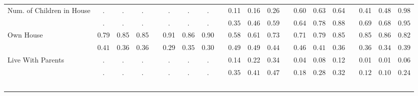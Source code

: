 \begin{center}
{\begin{longtable}{L{5cm} c c c p{.5cm} c c c p{.5cm} c c c p{.5cm} c c c p{.5cm} c c c}
 \quad Num. of Children in House & . &         . &         . & &         . &         . &         . & &      0.11 &      0.16 &      0.26 & &      0.60 &      0.63 &      0.64 & &      0.41 &      0.48 &      0.98 \\*
 \quad & $\mathit{        .}$ & $\mathit{        .}$ & $\mathit{        .}$ & & $\mathit{        .}$ & $\mathit{        .}$ & $\mathit{        .}$ & & $\mathit{     0.35}$ & $\mathit{     0.46}$ & $\mathit{     0.59}$ & & $\mathit{     0.64}$ & $\mathit{     0.78}$ & $\mathit{     0.88}$ & & $\mathit{     0.69}$ & $\mathit{     0.68}$ & $\mathit{     0.95}$ \\[.2em]
 \quad Own House & 0.79 &      0.85 &      0.85 & &      0.91 &      0.86 &      0.90 & &      0.58 &      0.61 &      0.73 & &      0.71 &      0.79 &      0.85 & &      0.85 &      0.86 &      0.82 \\*
 \quad & $\mathit{     0.41}$ & $\mathit{     0.36}$ & $\mathit{     0.36}$ & & $\mathit{     0.29}$ & $\mathit{     0.35}$ & $\mathit{     0.30}$ & & $\mathit{     0.49}$ & $\mathit{     0.49}$ & $\mathit{     0.44}$ & & $\mathit{     0.46}$ & $\mathit{     0.41}$ & $\mathit{     0.36}$ & & $\mathit{     0.36}$ & $\mathit{     0.34}$ & $\mathit{     0.39}$ \\[.2em]
 \quad Live With Parents & . &         . &         . & &         . &         . &         . & &      0.14 &      0.22 &      0.34 & &      0.04 &      0.08 &      0.12 & &      0.01 &      0.01 &      0.06 \\*
 \quad & $\mathit{        .}$ & $\mathit{        .}$ & $\mathit{        .}$ & & $\mathit{        .}$ & $\mathit{        .}$ & $\mathit{        .}$ & & $\mathit{     0.35}$ & $\mathit{     0.41}$ & $\mathit{     0.47}$ & & $\mathit{     0.18}$ & $\mathit{     0.28}$ & $\mathit{     0.32}$ & & $\mathit{     0.12}$ & $\mathit{     0.10}$ & $\mathit{     0.24}$ \\[.2em]
 ~\\[-.5em]
\hline
\end{longtable}
}
\end{center}
